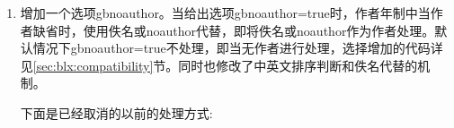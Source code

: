 \begin{enumerate}
\item 增加一个选项gbnoauthor。当给出选项gbnoauthor=true时，作者年制中当作者缺省时，使用佚名或noauthor代替，即将佚名或noauthor作为作者处理。默认情况下gbnoauthor=true不处理，即当无作者进行处理，选择增加的代码详见\ref{sec:blx:compatibility}节。同时也修改了中英文排序判断和佚名代替的机制。
    \begin{texlist}
        \map{%
            \step[fieldsource=author,match=\regexp{[^a-zA-Z\s\.\,\'\{\}\-\:0-9]},final]
            \step[fieldset=userb,fieldvalue={cn}]
            }
        \map{%
            \step[fieldsource=title,match=\regexp{[^a-zA-Z\s\.\,\'\{\}\-\:0-9]},final]
            \step[fieldset=userb,fieldvalue={cn}]
            }%
        \map{%
            \step[fieldset=userb,fieldvalue={en}]
            }
    \end{texlist}

    \begin{texlist}
    \def\dealnoathor{
    \DeclareStyleSourcemap{
    \maps[datatype=bibtex]{
            \map{%
                \step[fieldsource=userb,match={cn},final]
                \step[fieldset=author, fieldvalue={佚名}]
                }
            \map{%
                \step[fieldsource=userb,match={en},final]
                \step[fieldset=author, fieldvalue={NOAUTHOR}]
                }
        }
    }}
    \end{texlist}

    下面是已经取消的以前的处理方式:
    \begin{texlist}
        \map{%
            \step[fieldset=author, fieldvalue={佚名}]
            }
        \map[overwrite]{%
            \step[fieldsource=title,match=\regexp{[a-zA-Z]},final]
            \step[fieldsource=author,match=\regexp{佚名}, replace={NOAUTHOR}]
            }
        \map{%
            \step[fieldsource=author,match=\regexp{[^a-zA-Z\s\.\,\'\{\}\-]},final]
            \step[fieldset=userb,fieldvalue={cn}]
            }
        \map{%
            \step[fieldset=userb,fieldvalue={en}]
            }
    \end{texlist}



\end{enumerate}
